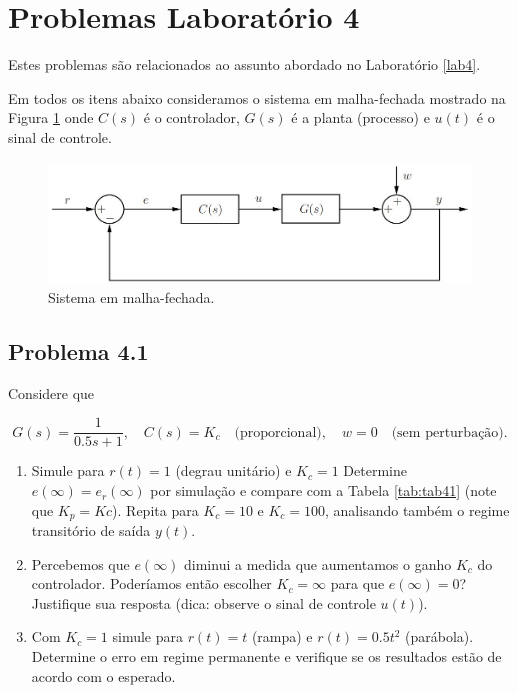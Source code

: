 \documentclass[
]{book}
\providecommand{\tightlist}{%
  \setlength{\itemsep}{0pt}\setlength{\parskip}{0pt}}
\theoremstyle{definition}
\theoremstyle{definition}
\theoremstyle{definition}
\theoremstyle{remark}
\begin{document}
\hypertarget{problemas-laboratuxf3rio-4}{%
\chapter*{Problemas Laboratório 4}\label{problemas-laboratuxf3rio-4}}

Estes problemas são relacionados ao assunto abordado no Laboratório \ref{lab4}.

Em todos os itens abaixo consideramos o sistema em malha-fechada mostrado na Figura \ref{fig:fig43} onde \(C(s)\) é o controlador, \(G(s)\) é a planta (processo) e \(u(t)\) é o sinal de controle.

\begin{figure}
\includegraphics[width=0.8\linewidth]{Imagens/Lab4/Apresentação/fig3} \caption{Sistema em malha-fechada.}\label{fig:fig43}
\end{figure}

\hypertarget{problema-4.1}{%
\section*{Problema 4.1}\label{problema-4.1}}

Considere que

\[
G(s) = \frac {1}{0.5s+1}, \quad C(s) = K_c \quad \text{(proporcional)}, \quad w=0 \quad \text{(sem perturbação)}.
\]

\begin{enumerate}
\def\labelenumi{\alph{enumi}.}
\tightlist
\item
  Simule para \(r(t) = 1\) (degrau unitário) e \(K_c = 1\) Determine \(e(\infty) = e_r(\infty)\) por simulação e compare com a Tabela \ref{tab:tab41} (note que \(K_p = Kc\)). Repita para \(K_c = 10\) e \(K_c = 100\), analisando também o regime transitório de saída \(y(t)\).
\item
  Percebemos que \(e(\infty)\) diminui a medida que aumentamos o ganho \(K_c\) do controlador. Poderíamos então escolher \(K_c = \infty\) para que \(e(\infty) = 0\)? Justifique sua resposta (dica: observe o sinal de controle \(u(t)\)).
\item
  Com \(K_c = 1\) simule para \(r(t) = t\) (rampa) e \(r(t) = 0.5t^2\) (parábola). Determine o erro em regime permanente e verifique se os resultados estão de acordo com o esperado.
\end{enumerate}
\end{document}
